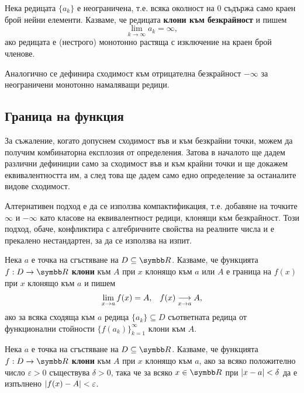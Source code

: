 \documentclass[numbers=endperiod, bibliography=totocnumbered]{scrartcl}
\begin{document}
\begin{definition}
  Нека редицата \( \{ a_k \} \) е неограничена, т.е. всяка околност на \( 0 \) съдържа само краен брой нейни елементи. Казваме, че редицата \textbf{клони към безкрайност} и пишем
  \begin{equation*}
    \lim_{k \to \infty} a_k = \infty,
  \end{equation*}
  ако редицата е (нестрого) монотонно растяща с изключение на краен брой членове.

  Аналогично се дефинира сходимост към отрицателна безкрайност \( -\infty \) за неограничени монотонно намаляващи редици.
\end{definition}

\subsection{Граница на функция}

\begin{remark}
  За съжаление, когато допуснем сходимост във и към безкрайни точки, можем да получим комбинаторна експлозия от определения. Затова в началото ще дадем различни дефиниции само за сходимост във и към крайни точки и ще докажем еквивалентността им, а след това ще дадем само едно определение за останалите видове сходимост.

  Алтернативен подход е да се използва компактификация, т.е. добавяне на точките \( \infty \) и \( -\infty \) като класове на еквивалентност редици, клонящи към безкрайност. Този подход, обаче, конфликтира с алгебричните свойства на реалните числа и е прекалено нестандартен, за да се използва на изпит.
\end{remark}

\begin{definition}
  Нека \( a \) е точка на сгъстяване на \( D \subseteq \R \). Казваме, че функцията \( f: D \to \R \) \textbf{клони} към \( A \) при \( x \) клонящо към \( a \) или \( A \) е граница на \( f(x) \) при \( x \) клонящо към \( a \) и пишем
  \begin{align*}
    \lim_{x \to a} f(x) = A,
    &&
    f(x) \Conv[x \to a]{} A,
  \end{align*}
  ако за всяка сходяща към \( a \) редица \( \{ a_k \} \subseteq D \) съответната редица от функционални стойности \( {\{ f(a_k) \}}_{k=1}^\infty \) клони към \( A \).
\end{definition}

\begin{definition}
  Нека \( a \) е точка на сгъстяване на \( D \subseteq \R \). Казваме, че функцията \( f: D \to \R \) \textbf{клони} към \( A \) при \( x \) клонящо към \( a \), ако за всяко положително число \( \varepsilon > 0 \) съществува \( \delta > 0 \), така че за всяко \( x \in \R \) при \( \Abs{x - a} < \delta \) да е изпълнено \( \Abs{f(x) - A} < \varepsilon \).
\end{definition}
\end{document}
